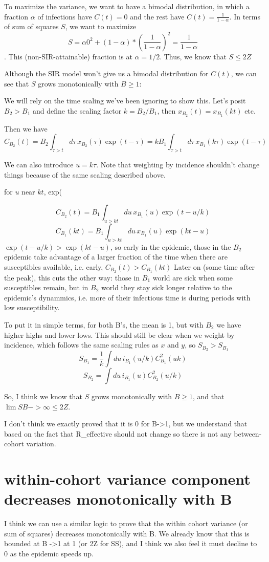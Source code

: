 \documentclass[12pt]{article}
\begin{document}
To maximize the variance, we want to have a bimodal distribution, in which a fraction $\alpha$ of infections have $C(t) = 0$ and the rest have $C(t) = \frac{1}{1-\alpha}$.
In terms of sum of squares $S$, we want to maximize
$$ S = \alpha 0^2 + (1-\alpha)*(\frac{1}{1-\alpha})^2 = \frac{1}{1-\alpha}$$.
This (non-SIR-attainable) fraction is at $\alpha = 1/2$.
Thus, we know that $S \leq 2Z$

Although the SIR model won't give us a bimodal distribution for $C(t)$, we can see that $S$ grows monotonically with $B \geq 1$:

We will rely on the time scaling we've been ignoring to show this. Let's posit $B_2>B_1$ and define the scaling factor
$k = B_2/B_1$, then
$x_{B_2}(t) = x_{B_1}(kt)$ etc.

Then we have
$$C_{B_2}(t) = B_2 \int_{\tau>t}{d\tau\, x_{B_2}(\tau) \exp(t-\tau)} = kB_1\int_{\tau>t}{d\tau\, x_{B_1}(k\tau) \exp(t-\tau)}$$


We can also introduce $u = k\tau$. Note that weighting by incidence shouldn't change things because of the same scaling described above.



for $u$ near $kt$, exp(


$$C_{B_2}(t) = B_1 \int_{u>kt}{du\,x_{B_1}(u)\exp(t-u/k)}$$
$$C_{B_1}(kt) = B_1 \int_{u>kt}{du\,x_{B_1}(u)\exp(kt-u)}$$
$\exp(t-u/k) > \exp(kt-u)$, so early in the epidemic, those in the $B_2$ epidemic take advantage of a larger fraction of the time when there are susceptibles available, i.e. early, $C_{B_2}(t)>C_{B_1}(kt)$
Later on (some time after the peak), this cuts the other way: those in $B_1$ world are sick when some susceptibles remain, but in $B_2$ world they stay sick longer relative to the epidemic's dynammics, i.e. more of their infectious time is during periods with low susceptibility.

To put it in simple terms, for both B's, the mean is 1, but with $B_2$ we have higher highs and lower lows.
This should still be clear when we weight by incidence, which follows the same scaling rules as $x$ and $y$, so $S_{B_2}>S_{B_1}$
$$S_{B_1} = \frac{1}{k}\int{du\, i_{B_1}(u/k) C^2_{B_1}(uk)}$$
$$S_{B_2}  = \int{du\, i_{B_1}(u) C^2_{B_2}(u/k)} $$

So, I think we know that $S$ grows monotonically with $B \geq 1$, and that $\lim{S} B-> \infty \leq 2Z$.

I don't think we exactly proved that it is 0 for B->1, but we understand that based on the fact that R_effective should not change so there is not any between-cohort variation.

\section{within-cohort variance component decreases monotonically with B}
I think we can use a similar logic to prove that the within cohort variance (or sum of squares) decreases monotonically with B. We already know that this is bounded at B ->1 at 1 (or 2Z for SS), and I think we also feel it must decline to 0 as the epidemic speeds up.
\end{document}
